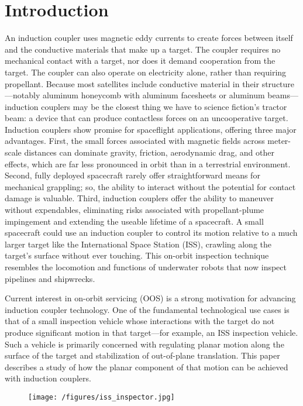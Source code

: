 \section{Introduction} 
An induction coupler uses magnetic eddy currents to create forces between itself and the conductive materials that make up a target. The coupler requires no mechanical contact with a target, nor does it demand cooperation from the target. The coupler can also operate on electricity alone, rather than requiring propellant. Because most satellites include conductive material in their structure—notably aluminum honeycomb with aluminum facesheets or aluminum beams—induction couplers may be the closest thing we have to science fiction's tractor beam: a device that can produce  contactless forces on an uncooperative target. 
Induction couplers show promise for spaceflight applications, offering three major advantages. First, the small forces associated with magnetic fields across meter-scale distances can dominate gravity, friction, aerodynamic drag, and other effects, which are far less pronounced in orbit than in a terrestrial environment. Second, fully deployed spacecraft rarely offer straightforward means for mechanical grappling; so, the ability to interact without the potential for contact damage is valuable. Third, induction couplers offer the ability to maneuver without expendables, eliminating risks associated with propellant-plume impingement and extending the useable lifetime of a spacecraft.
A small spacecraft could use an induction coupler to control its motion relative to a much larger target like the International Space Station (ISS), crawling along the target’s surface without ever touching. This on-orbit inspection technique resembles the locomotion and functions of underwater robots that now inspect pipelines and shipwrecks. 
 
Current interest in on-orbit servicing (OOS) is a strong motivation for advancing induction coupler technology. One of the fundamental technological use cases is that of a small inspection vehicle whose interactions with the target do not produce significant motion in that target—for example, an ISS inspection vehicle. Such a vehicle is primarily concerned with regulating planar motion along the surface of the target and stabilization of out-of-plane translation. This paper  describes a study of how the planar component of that motion can be achieved with induction couplers. 

\begin{figure} 
\texttt{[image: /figures/iss\_inspector.jpg]}
\label{fig:issinspector}
\end{figure}

